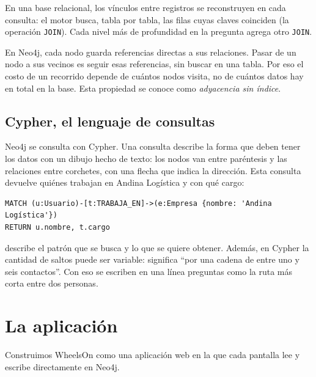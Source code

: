 \documentclass[11pt, a4paper]{article}
\newcommand{\cod}[1]{\texttt{\detokenize{#1}}}
\begin{document}
En una base relacional, los vínculos entre registros se reconstruyen en cada consulta:
el motor busca, tabla por tabla, las filas cuyas claves coinciden (la operación
\texttt{JOIN}). Cada nivel más de profundidad en la pregunta agrega otro \texttt{JOIN}.

En Neo4j, cada nodo guarda referencias directas a sus relaciones. Pasar de un nodo a
sus vecinos es seguir esas referencias, sin buscar en una tabla. Por eso el costo de
un recorrido depende de cuántos nodos visita, no de cuántos datos hay en total en la
base. Esta propiedad se conoce como \emph{adyacencia sin índice}.

\subsection{Cypher, el lenguaje de consultas}

Neo4j se consulta con Cypher. Una consulta describe la forma que deben tener los datos
con un dibujo hecho de texto: los nodos van entre paréntesis y las relaciones entre
corchetes, con una flecha que indica la dirección. Esta consulta devuelve quiénes
trabajan en Andina Logística y con qué cargo:

\begin{lstlisting}
MATCH (u:Usuario)-[t:TRABAJA_EN]->(e:Empresa {nombre: 'Andina Logística'})
RETURN u.nombre, t.cargo
\end{lstlisting}

\cod{MATCH} describe el patrón que se busca y \cod{RETURN} lo que se quiere obtener.
Además, en Cypher la cantidad de saltos puede ser variable:
\cod{-[:CONECTA_CON*..6]-} significa ``por una cadena de entre uno y seis contactos''.
Con eso se escriben en una línea preguntas como la ruta más corta entre dos personas.

\section{La aplicación}\label{sec:app}

Construimos WheelsOn como una aplicación web en la que cada pantalla lee y escribe
directamente en Neo4j.
\end{document}
